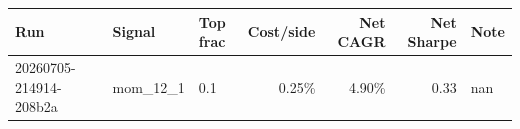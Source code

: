 \begin{tabular}{lllrrrl}
\toprule
Run & Signal & Top frac & Cost/side & Net CAGR & Net Sharpe & Note \\
\midrule
20260705-214914-208b2a & mom_12_1 & 0.1 & 0.25\% & 4.90\% & 0.33 & nan \\
\bottomrule
\end{tabular}
